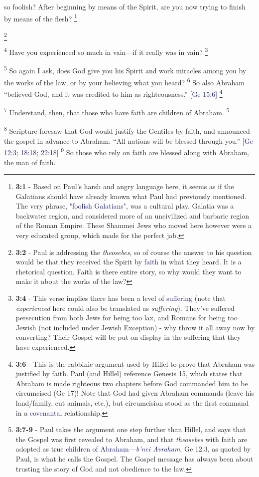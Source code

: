\documentclass[12pt,twoside]{article}
\newcommand{\vs}[1]{\textsuperscript{#1}}
\newcommand{\vnote}[2]{%
  \begingroup
  \renewcommand\thefootnote{}%
  \footnote{\scriptsize \textbf{}#2}%
  \addtocounter{footnote}{-1}%
  \endgroup
}
\begin{document}
 \noindent so foolish? After beginning by means of the Spirit, are you now trying to finish by means of the flesh?\vnote{1}{\textbf{3:1} - Based on Paul's harsh and angry language here, it seems as if the Galatians should have already known what Paul had previously mentioned. The very phrase, \textcolor{MidnightBlue}{"foolish Galatians"}, was a cultural play. Galatia was a backwater region, and considered more of an uncivilized and barbaric region of the Roman Empire. These Shammei Jews who moved here however were a very educated group, which made for the perfect jab.}\vnote{2}{\textbf{3:2} - Paul is addressing the \textit{theosebes}, so of course the answer to his question would be that they received the Spirit by \textcolor{MidnightBlue}{faith} in what they heard. It is a  rhetorical question. Faith is there entire story, so why would they want to make it about the works of the law?}
 \vs{4} Have you experienced so much in vain---if it really was in vain?\vnote{4}{\textbf{3:4} - This verse implies there has been a level of \textcolor{MidnightBlue}{suffering} (note that \textit{experienced} here could also be translated as \textit{suffering}). They've suffered persecution from both Jews for being too lax, and Romans for being too Jewish (not included under Jewish Exception) - why throw it all away now by converting? Their Gospel will be put on display in the suffering that they have experienced.}
 \vs{5} So again I ask, does God give you his Spirit and work miracles among you by the works of the law, or by your believing what you heard?
 \vs{6} So also Abraham ``believed God, and it was credited to him as righteousness.'' {\fontsize{8pt}{5pt}\selectfont\textcolor{MidnightBlue}{[Ge 15:6]}}\vnote{6}{\textbf{3:6} - This is the rabbinic argument used by Hillel to prove that Abraham was justified by faith. Paul (and Hillel) reference Genesis 15, which states that Abraham is made righteous two chapters before God commanded him to be circumcised (Ge 17)! Note that God had given Abraham commands (leave his land/family, cut animals, etc.), but circumcision stood as the first command in a \textcolor{MidnightBlue}{covenantal} relationship.}

 \vs{7} Understand, then, that those who have faith are children of Abraham.\vnote{7}{\textbf{3:7-9} - Paul takes the argument one step further than Hillel, and says that the Gospel was first revealed to Abraham, and that \textit{theosebes} with faith are adopted as true \textcolor{MidnightBlue}{children of Abraham---\textit{b'nei Avraham}}. Ge 12:3, as quoted by Paul, is what he calls the Gospel. The Gospel message has always been about trusting the story of God and not obedience to the law.}
 \vs{8} Scripture foresaw that God would justify the Gentiles by faith, and announced the gospel in advance to Abraham: ``All nations will be blessed through you.'' {\fontsize{8pt}{5pt}\selectfont\textcolor{MidnightBlue}{[Ge 12:3; 18:18; 22:18]}}
 \vs{9} So those who rely on faith are blessed along with Abraham, the man of faith.
\end{document}
